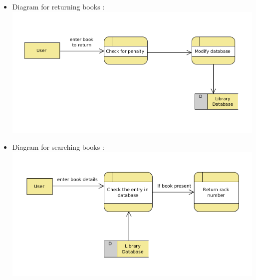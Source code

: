 \documentclass[a4paper]{article}
\begin{document}
\begin{itemize}
\begin{itemize}
\item Diagram for returning books : \\ \includegraphics[scale=0.5]{images/dfdDiagReturnBook.png}\\
\item Diagram for searching books : \\ \includegraphics[scale=0.5]{images/dfdDiagSearch.png}\\
\end{itemize}
\end{itemize}
\end{document}
